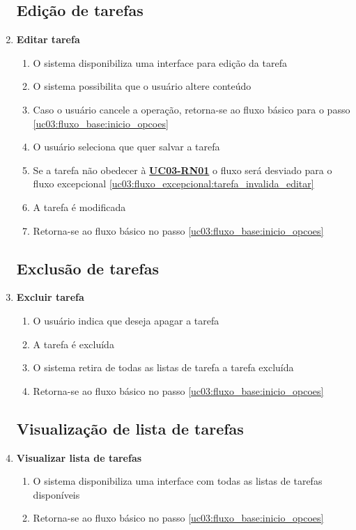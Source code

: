 \documentclass[
	12pt,				%
	oneside,			%
	a4paper,			%
	english,			%
	brazil,				%
	]{abntex2}
\begin{document}
\begin{enumerate}[label=\textbf{UC03-FA{\arabic*}},font=\normalsize]
    \subsection{Edição de tarefas}
    \item \textbf{\normalsize Editar tarefa}
    \label{uc03:fluxo_alternativo:editar_tarefa}
    \begin{enumerate}[label={\arabic*}.]
        \item O sistema disponibiliza uma interface para edição da tarefa
        \item O sistema possibilita que o usuário altere conteúdo \label{uc03:fluxo_alternativo:editar_tarefa:inicio_interacao}
         \item Caso o usuário cancele a operação, retorna-se ao fluxo básico para o passo \ref{uc03:fluxo_base:inicio_opcoes}
        \item O usuário seleciona que quer salvar a tarefa
        \item Se a tarefa não obedecer à \textbf{\hyperref[uc03:rn01_validar_tarefa]{UC03-RN01}} o fluxo será desviado para o fluxo excepcional \ref{uc03:fluxo_excepcional:tarefa_invalida_editar}
        \item A tarefa é modificada
        \item Retorna-se ao fluxo básico no passo \ref{uc03:fluxo_base:inicio_opcoes}
    \end{enumerate}
    
    \subsection{Exclusão de tarefas}
    \item \textbf{\normalsize Excluir tarefa}
    \label{uc03:fluxo_alternativo:excluir_tarefa}
    \begin{enumerate}[label={\arabic*}.]
        \item O usuário indica que deseja apagar a tarefa
        \item A tarefa é excluída
        \item O sistema retira de todas as listas de tarefa a tarefa excluída
        \item Retorna-se ao fluxo básico no passo \ref{uc03:fluxo_base:inicio_opcoes}
    \end{enumerate}

    \subsection{Visualização de lista de tarefas}
    \item \textbf{\normalsize Visualizar lista de tarefas} \label{uc03:fluxo_alternativo:visualizar_lista_tarefa}
    \begin{enumerate}[label={\arabic*}.]
        \item O sistema disponibiliza uma interface com todas as listas de tarefas disponíveis 
        \item Retorna-se ao fluxo básico no passo \ref{uc03:fluxo_base:inicio_opcoes}
    \end{enumerate}
    

\end{enumerate}
\end{document}
